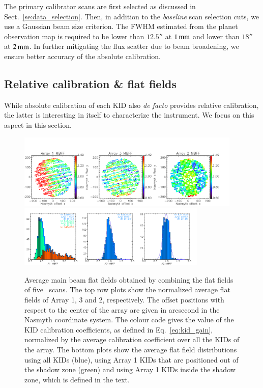 The primary calibrator scans are first selected as discussed in
Sect.~\ref{se:data_selection}. Then, in addition to
the \emph{baseline} scan selection cuts, we use a Gaussian beam size
criterion. The FWHM estimated from the planet
observation map is required to be lower than $12.5''$ at $1\,\rm{mm}$ and lower
than $18''$ at $2\,\rm{mm}$. In further mitigating the flux scatter
due to beam broadening, we ensure better accuracy of the absolute
calibration.



\subsection{Relative calibration \& flat fields}
\label{se:flat_field}
While absolute calibration of each KID also \emph{de facto} provides
relative calibration, the latter is interesting in itself to
characterize the instrument. We focus on this aspect in this
section.

\begin{figure}[!thbp] 
\begin{center}
  \includegraphics[width=0.95\textwidth]{Figures/Average_main_beam_flat_field_N2R9_10.png}
  \includegraphics[width=0.8\textwidth]{Figures/Histo_average_main_beam_flat_field_N2R9_10.png}
\caption[Average main beam flat fields]{Average main beam flat fields
  obtained by combining the flat fields of five
  \bm\ scans. The top row plots show the normalized average flat fields of Array
  1, 3 and 2, respectively. {\lp The offset positions with respect to the center of
  the array are given in arcsecond in the Nasmyth coordinate
  system. The colour code gives the value of the KID calibration
  coefficients, as defined in Eq.~\ref{eq:kid_gain}, normalized by the
  average calibration coefficient over all the
  KIDs of the array.} The bottom plots
  show the average flat field distributions using all KIDs (blue),
  using Array 1 KIDs that are positioned out of the shadow zone
  (green) and using Array 1 KIDs inside the shadow zone, which is
  defined in the text.}
 \label{fig:avg_mbff}
\end{center}
\end{figure}

